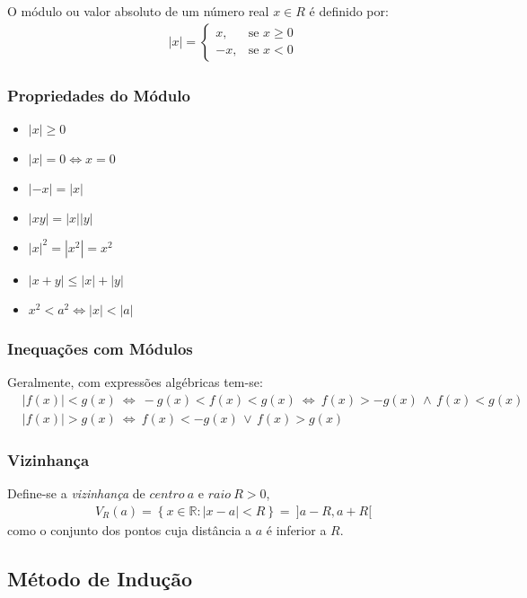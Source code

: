 \documentclass[11pt]{article}
\newcommand{\twopartdef}[4]
{ \displaystyle
	\left\{
		\begin{array}{ll}
			#1, & \mbox{se } #2 \\
			#3, & \mbox{se } #4
		\end{array}
	\right.
}
\begin{document}
O módulo ou valor absoluto de um número real $x \in R$ é definido por:
\begin{align*}
    |x| = \twopartdef{x}{x \geq 0}{-x}{x < 0}
\end{align*}

\subsubsection{Propriedades do Módulo}

\begin{itemize}[itemsep=2pt]
    \item $|x| \geq 0$
    \item $|x| = 0 \Leftrightarrow  x = 0$
    \item $|-x| = |x|$
    \item $|xy| = |x||y|$
    \item $|x|^2 = \left\lvert x^2\right\rvert = x^2$
    \item $|x + y| \leq |x| + |y|$
    \item $x^2 < a^2 \Leftrightarrow |x| < |a|$
\end{itemize}

\subsubsection{Inequações com Módulos}

Geralmente, com expressões algébricas tem-se:
\begin{align*}
    & \left\lvert f(x)\right\rvert < g(x)\ \Leftrightarrow\ -g(x) < f(x) < g(x)\ \Leftrightarrow\ f(x) > -g(x)\,\land \,f(x) < g(x) \\
    & \left\lvert f(x)\right\rvert > g(x)\ \Leftrightarrow\ f(x) < -g(x)\,\lor\,f(x) > g(x)
\end{align*}

\subsubsection{Vizinhança}

Define-se a \textit{vizinhança} de $centro\ a$ e $raio\ R > 0$, 
\begin{align*}
    V_R(a) = \left\{x \in \mathbb{R}:|x-a| < R\right\} =\ ]a-R, a+R[
\end{align*}
como o conjunto dos pontos cuja distância a $a$ é inferior a $R$.

\subsection{Método de Indução}
\end{document}

